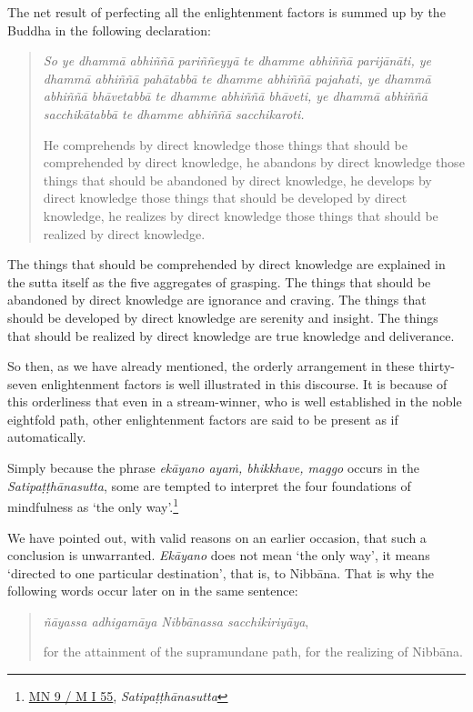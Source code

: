 The net result of perfecting all the enlightenment factors is summed up by the Buddha in the following declaration:

\begin{quote}
\emph{So ye dhammā abhiññā pariññeyyā te dhamme abhiññā parijānāti, ye dhammā abhiññā pahātabbā te dhamme abhiññā pajahati, ye dhammā abhiññā bhāvetabbā te dhamme abhiññā bhāveti, ye dhammā abhiññā sacchikātabbā te dhamme abhiññā sacchikaroti.}

He comprehends by direct knowledge those things that should be comprehended by direct knowledge, he abandons by direct knowledge those things that should be abandoned by direct knowledge, he develops by direct knowledge those things that should be developed by direct knowledge, he realizes by direct knowledge those things that should be realized by direct knowledge.
\end{quote}

The things that should be comprehended by direct knowledge are explained in the sutta itself as the five aggregates of grasping. The things that should be abandoned by direct knowledge are ignorance and craving. The things that should be developed by direct knowledge are serenity and insight. The things that should be realized by direct knowledge are true knowledge and deliverance.

So then, as we have already mentioned, the orderly arrangement in these thirty-seven enlightenment factors is well illustrated in this discourse. It is because of this orderliness that even in a stream-winner, who is well established in the noble eightfold path, other enlightenment factors are said to be present as if automatically.

Simply because the phrase \emph{ekāyano ayaṁ, bhikkhave, maggo} occurs in the \emph{Satipaṭṭhānasutta}, some are tempted to interpret the four foundations of mindfulness as `the only way'.\footnote{\href{https://suttacentral.net/mn9/pli/ms}{MN 9 / M I 55}, \emph{Satipaṭṭhānasutta}}

We have pointed out, with valid reasons on an earlier occasion, that such a conclusion is unwarranted. \emph{Ekāyano} does not mean `the only way', it means `directed to one particular destination', that is, to Nibbāna. That is why the following words occur later on in the same sentence:

\begin{quote}
\emph{ñāyassa adhigamāya Nibbānassa sacchikiriyāya},

for the attainment of the supramundane path, for the realizing of Nibbāna.
\end{quote}

